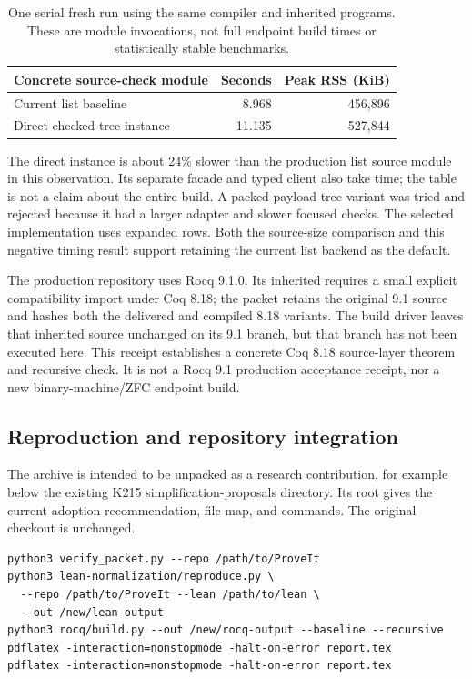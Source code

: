 \begin{table}[ht]
\centering
\begin{tabular}{lrr}
\toprule
Concrete source-check module & Seconds & Peak RSS (KiB)\\
\midrule
Current list baseline & 8.968 & 456,896\\
Direct checked-tree instance & 11.135 & 527,844\\
\bottomrule
\end{tabular}
\caption{One serial fresh run using the same compiler and inherited programs. These are module invocations, not full endpoint build times or statistically stable benchmarks.}
\end{table}

The direct instance is about 24\% slower than the production list source module in this observation. Its separate facade and typed client also take time; the table is not a claim about the entire build. A packed-payload tree variant was tried and rejected because it had a larger adapter and slower focused checks. The selected implementation uses expanded rows. Both the source-size comparison and this negative timing result support retaining the current list backend as the default.

The production repository uses Rocq 9.1.0. Its inherited  requires a small explicit compatibility import under Coq 8.18; the packet retains the original 9.1 source and hashes both the delivered and compiled 8.18 variants. The build driver leaves that inherited source unchanged on its 9.1 branch, but that branch has not been executed here. This receipt establishes a concrete Coq 8.18 source-layer theorem and recursive check. It is not a Rocq 9.1 production acceptance receipt, nor a new binary-machine/ZFC endpoint build.

\subsection{Reproduction and repository integration}
The archive is intended to be unpacked as a research contribution, for example below the existing K215 simplification-proposals directory. Its root  gives the current adoption recommendation, file map, and commands. The original checkout is unchanged.

\begin{lstlisting}
python3 verify_packet.py --repo /path/to/ProveIt
python3 lean-normalization/reproduce.py \
  --repo /path/to/ProveIt --lean /path/to/lean \
  --out /new/lean-output
python3 rocq/build.py --out /new/rocq-output --baseline --recursive
pdflatex -interaction=nonstopmode -halt-on-error report.tex
pdflatex -interaction=nonstopmode -halt-on-error report.tex
\end{lstlisting}

